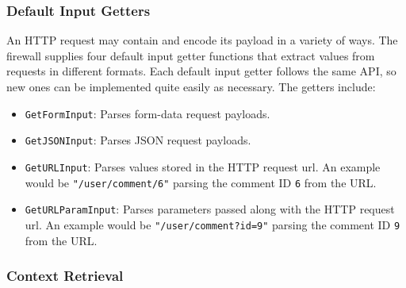 




\subsubsection{Default Input Getters}\label{Sec:DefaultInputGetters}

An HTTP request may contain and encode its payload in a variety of ways. The firewall supplies four default input getter functions that extract values from requests in different formats. Each default input getter follows the same API, so new ones can be implemented quite easily as necessary. The getters include:

\begin{itemize}[nosep]
\item \lstinline{GetFormInput}: Parses form-data request payloads.

\item \lstinline{GetJSONInput}: Parses JSON request payloads.

\item \lstinline{GetURLInput}: Parses values stored in the HTTP request url. An example would be \lstinline{"/user/comment/6"} parsing the comment ID \lstinline{6} from the URL.

\item \lstinline{GetURLParamInput}: Parses parameters passed along with the HTTP request url. An example would be \lstinline{"/user/comment?id=9"} parsing the comment ID \lstinline{9} from the URL.

\end{itemize}

\subsubsection{Context Retrieval}\label{Sec:ContextRetrieval}


